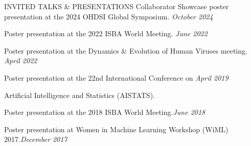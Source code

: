 \documentclass{resume} %
\begin{document}
\begin{rSection}{INVITED TALKS \& PRESENTATIONS}
	Collaborator Showcase poster presentation at the 2024 OHDSI Global Symposium.  \hfill {\em October 2024}
	
	Poster presentation at the 2022 ISBA World Meeting. \hfill {\em June 2022}
	
	Poster presentation at the Dynamics \& Evolution of Human Viruses meeting.  \hfill {\em April 2022}
	
	
	Poster presentation at the 22nd International Conference on   \hfill {\em April 2019}
	
	\vspace{-0.1in}
	Artificial Intelligence and Statistics (AISTATS).
	
	
	
	Poster presentation at the 2018 ISBA World Meeting.\hfill {\em June 2018}
	
	Poster presentation at Women in Machine Learning Workshop (WiML) 2017.\hfill {\em December 2017}
	
\end{rSection}















%
%
%
%
%
%
%
%
%
%
\end{document}
